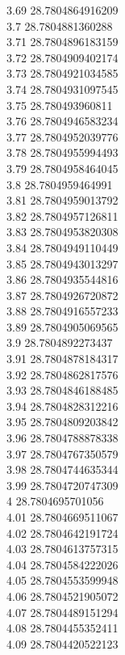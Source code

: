 {3.69	28.7804864916209\\
3.7	28.7804881360288\\
3.71	28.7804896183159\\
3.72	28.7804909402174\\
3.73	28.7804921034585\\
3.74	28.7804931097545\\
3.75	28.780493960811\\
3.76	28.7804946583234\\
3.77	28.7804952039776\\
3.78	28.7804955994493\\
3.79	28.7804958464045\\
3.8	28.7804959464991\\
3.81	28.7804959013792\\
3.82	28.7804957126811\\
3.83	28.7804953820308\\
3.84	28.7804949110449\\
3.85	28.7804943013297\\
3.86	28.7804935544816\\
3.87	28.7804926720872\\
3.88	28.7804916557233\\
3.89	28.7804905069565\\
3.9	28.7804892273437\\
3.91	28.7804878184317\\
3.92	28.7804862817576\\
3.93	28.7804846188485\\
3.94	28.7804828312216\\
3.95	28.7804809203842\\
3.96	28.7804788878338\\
3.97	28.7804767350579\\
3.98	28.7804744635344\\
3.99	28.7804720747309\\
4	28.7804695701056\\
4.01	28.7804669511067\\
4.02	28.7804642191724\\
4.03	28.7804613757315\\
4.04	28.7804584222026\\
4.05	28.7804553599948\\
4.06	28.7804521905072\\
4.07	28.7804489151294\\
4.08	28.7804455352411\\
4.09	28.7804420522123\\
}
